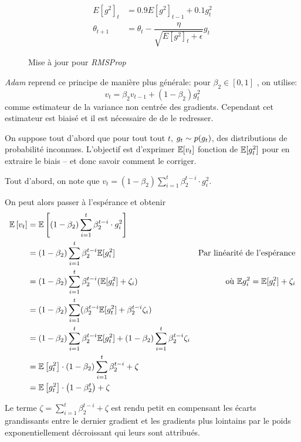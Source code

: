 \documentclass[fleqn,11pt, titlepage, french]{article}
\begin{document}
	\begin{figure}[H]
		\centering
		\begin{align*}
			E[g^2]_t &= 0.9 E[g^2]_{t-1} + 0.1 g^2_t \\ 
			\theta_{t+1} &= \theta_{t} - \dfrac{\eta}{\sqrt{E[g^2]_t + \epsilon}} g_{t} 
		\end{align*}
		\caption{Mise à jour pour \emph{RMSProp}}
	\end{figure}

	\emph{Adam} reprend ce principe de manière plus générale: pour $\beta_2 \in [0,1]$ , on utilise: \[v_t = \beta_2 v_{t-1} +  (1-\beta_2)g_t^2\] comme estimateur de la variance non centrée des gradients. Cependant cet estimateur est biaisé et il est nécessaire de de le redresser.
	
	On suppose tout d'abord que pour tout tout $t$, $g_t \sim p(g_t)$, des distributions de probabilité inconnues. L'objectif est d'exprimer $\mathbb{E}[v_t]$ fonction de $\mathbb{E}[g_t^2]$ pour en extraire le biais -- et donc savoir comment le corriger.
	
	Tout d'abord, on note que $v_{t}=\left(1-\beta_{2}\right) \sum_{i=1}^{t} \beta_{2}^{t-i} \cdot g_{i}^{2}$.
	
	On peut alors passer à l'espérance et obtenir
	\begin{align*} 
		\mathbb{E}\left[v_{t}\right] &=\mathbb{E}\left[\left(1-\beta_{2}\right) \sum_{i=1}^{t} \beta_{2}^{t-i} \cdot g_{i}^{2}\right] \\ 
		&=\left(1-\beta_{2}\right) \sum_{i=1}^{t} \beta_{2}^{t-i}  \mathbb{E} [g_{i}^{2}] &\text{Par linéarité de l'espérance} \\ 
		&=\left(1-\beta_{2}\right) \sum_{i=1}^{t} \beta_{2}^{t-i}  (\mathbb{E} [g_{t}^{2}] + \zeta_i)  		&\text{où $\mathbb{E} g_{i}^{2} = \mathbb{E}[g_{t}^{2}] + \zeta_i$} \\
		&=\left(1-\beta_{2}\right) \sum_{i=1}^{t} (\beta_{2}^{t-i}  \mathbb{E} [g_{t}^{2}] + \beta_{2}^{t-i} \zeta_i) \\
		&=\left(1-\beta_{2}\right) \sum_{i=1}^{t} \beta_{2}^{t-i}  \mathbb{E} [g_{t}^{2}] + \left(1-\beta_{2}\right) \sum_{i=1}^{t} \beta_{2}^{t-i} \zeta_i \\
		&=\mathbb{E}\left[g_{t}^{2}\right] \cdot\left(1-\beta_{2}\right) \sum_{i=1}^{t} \beta_{2}^{t-i}+\zeta \\ 
		&=\mathbb{E}\left[g_{t}^{2}\right] \cdot\left(1-\beta_{2}^{t}\right)+\zeta
	\end{align*}
	
	Le terme $\zeta = \sum_{i=1}^{t} \beta_{2}^{t-i}+\zeta$ est rendu petit en compensant les écarts grandissants entre le dernier gradient et les gradients plus lointains par le poids exponentiellement décroissant qui leurs sont attribués.
	
\end{document}
